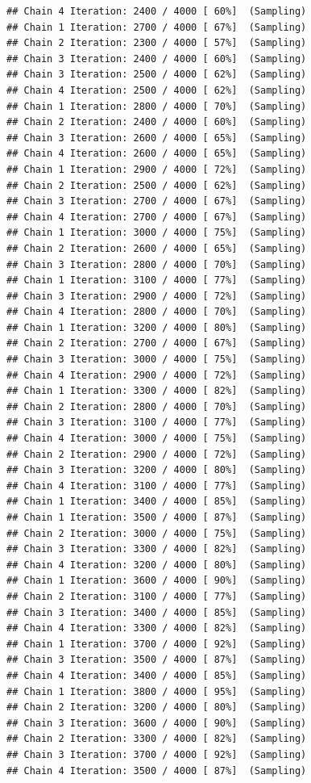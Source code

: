 \documentclass[
]{article}
\begin{document}
\begin{verbatim}
## Chain 4 Iteration: 2400 / 4000 [ 60%]  (Sampling) 
## Chain 1 Iteration: 2700 / 4000 [ 67%]  (Sampling) 
## Chain 2 Iteration: 2300 / 4000 [ 57%]  (Sampling) 
## Chain 3 Iteration: 2400 / 4000 [ 60%]  (Sampling) 
## Chain 3 Iteration: 2500 / 4000 [ 62%]  (Sampling) 
## Chain 4 Iteration: 2500 / 4000 [ 62%]  (Sampling) 
## Chain 1 Iteration: 2800 / 4000 [ 70%]  (Sampling) 
## Chain 2 Iteration: 2400 / 4000 [ 60%]  (Sampling) 
## Chain 3 Iteration: 2600 / 4000 [ 65%]  (Sampling) 
## Chain 4 Iteration: 2600 / 4000 [ 65%]  (Sampling) 
## Chain 1 Iteration: 2900 / 4000 [ 72%]  (Sampling) 
## Chain 2 Iteration: 2500 / 4000 [ 62%]  (Sampling) 
## Chain 3 Iteration: 2700 / 4000 [ 67%]  (Sampling) 
## Chain 4 Iteration: 2700 / 4000 [ 67%]  (Sampling) 
## Chain 1 Iteration: 3000 / 4000 [ 75%]  (Sampling) 
## Chain 2 Iteration: 2600 / 4000 [ 65%]  (Sampling) 
## Chain 3 Iteration: 2800 / 4000 [ 70%]  (Sampling) 
## Chain 1 Iteration: 3100 / 4000 [ 77%]  (Sampling) 
## Chain 3 Iteration: 2900 / 4000 [ 72%]  (Sampling) 
## Chain 4 Iteration: 2800 / 4000 [ 70%]  (Sampling) 
## Chain 1 Iteration: 3200 / 4000 [ 80%]  (Sampling) 
## Chain 2 Iteration: 2700 / 4000 [ 67%]  (Sampling) 
## Chain 3 Iteration: 3000 / 4000 [ 75%]  (Sampling) 
## Chain 4 Iteration: 2900 / 4000 [ 72%]  (Sampling) 
## Chain 1 Iteration: 3300 / 4000 [ 82%]  (Sampling) 
## Chain 2 Iteration: 2800 / 4000 [ 70%]  (Sampling) 
## Chain 3 Iteration: 3100 / 4000 [ 77%]  (Sampling) 
## Chain 4 Iteration: 3000 / 4000 [ 75%]  (Sampling) 
## Chain 2 Iteration: 2900 / 4000 [ 72%]  (Sampling) 
## Chain 3 Iteration: 3200 / 4000 [ 80%]  (Sampling) 
## Chain 4 Iteration: 3100 / 4000 [ 77%]  (Sampling) 
## Chain 1 Iteration: 3400 / 4000 [ 85%]  (Sampling) 
## Chain 1 Iteration: 3500 / 4000 [ 87%]  (Sampling) 
## Chain 2 Iteration: 3000 / 4000 [ 75%]  (Sampling) 
## Chain 3 Iteration: 3300 / 4000 [ 82%]  (Sampling) 
## Chain 4 Iteration: 3200 / 4000 [ 80%]  (Sampling) 
## Chain 1 Iteration: 3600 / 4000 [ 90%]  (Sampling) 
## Chain 2 Iteration: 3100 / 4000 [ 77%]  (Sampling) 
## Chain 3 Iteration: 3400 / 4000 [ 85%]  (Sampling) 
## Chain 4 Iteration: 3300 / 4000 [ 82%]  (Sampling) 
## Chain 1 Iteration: 3700 / 4000 [ 92%]  (Sampling) 
## Chain 3 Iteration: 3500 / 4000 [ 87%]  (Sampling) 
## Chain 4 Iteration: 3400 / 4000 [ 85%]  (Sampling) 
## Chain 1 Iteration: 3800 / 4000 [ 95%]  (Sampling) 
## Chain 2 Iteration: 3200 / 4000 [ 80%]  (Sampling) 
## Chain 3 Iteration: 3600 / 4000 [ 90%]  (Sampling) 
## Chain 2 Iteration: 3300 / 4000 [ 82%]  (Sampling) 
## Chain 3 Iteration: 3700 / 4000 [ 92%]  (Sampling) 
## Chain 4 Iteration: 3500 / 4000 [ 87%]  (Sampling) 

\end{verbatim}
\end{document}
